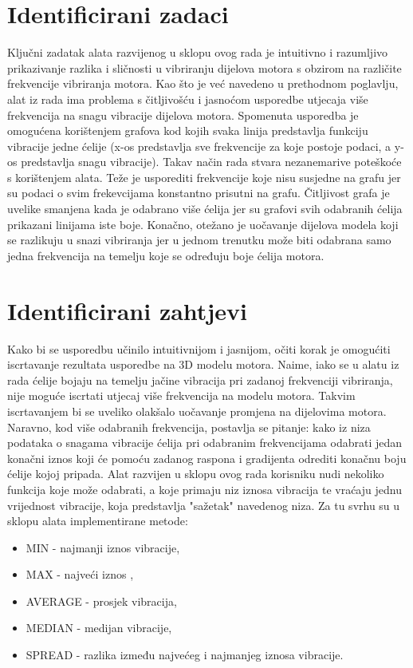 \documentclass[times, utf8, diplomski]{fer}
\begin{document}
\section{Identificirani zadaci}
Ključni zadatak alata razvijenog u sklopu ovog rada je intuitivno i razumljivo prikazivanje razlika i sličnosti u vibriranju dijelova motora s obzirom na različite frekvencije vibriranja motora. Kao što je već navedeno u prethodnom poglavlju, alat iz rada \citep{matkovic2021getting} ima problema s čitljivošću i jasnoćom usporedbe utjecaja više frekvencija na snagu vibracije dijelova motora. Spomenuta usporedba je omogućena korištenjem grafova kod kojih svaka linija predstavlja funkciju vibracije jedne ćelije (x-os predstavlja sve frekvencije za koje postoje podaci, a y-os predstavlja snagu vibracije). Takav način rada stvara nezanemarive poteškoće s korištenjem alata. Teže je usporediti frekvencije koje nisu susjedne na grafu jer su podaci o svim frekevcijama konstantno prisutni na grafu. Čitljivost grafa je uvelike smanjena kada je odabrano više ćelija jer su grafovi svih odabranih ćelija prikazani linijama iste boje. Konačno, otežano je uočavanje dijelova modela koji se razlikuju u snazi vibriranja jer u jednom trenutku može biti odabrana samo jedna frekvencija na temelju koje se određuju boje ćelija motora.

\section{Identificirani zahtjevi} \label{requests-section}
Kako bi se usporedbu učinilo intuitivnijom i jasnijom, očiti korak je omogućiti iscrtavanje rezultata usporedbe na 3D modelu motora. Naime, iako se u alatu iz rada \citep{matkovic2021getting} ćelije bojaju na temelju jačine vibracija pri zadanoj frekvenciji vibriranja, nije moguće iscrtati utjecaj više frekvencija na modelu motora. Takvim iscrtavanjem bi se uveliko olakšalo uočavanje promjena na dijelovima motora. Naravno, kod više odabranih frekvencija, postavlja se pitanje: kako iz niza podataka o snagama vibracije ćelija pri odabranim frekvencijama odabrati jedan konačni iznos koji će pomoću zadanog raspona i gradijenta odrediti konačnu boju ćelije kojoj pripada. Alat razvijen u sklopu ovog rada korisniku nudi nekoliko funkcija koje može odabrati, a koje primaju niz iznosa vibracija te vraćaju jednu vrijednost vibracije, koja predstavlja "sažetak" navedenog niza. Za tu svrhu su u sklopu alata implementirane metode:

\begin{itemize}
\item MIN - najmanji iznos vibracije,
\item MAX - najveći iznos ,
\item AVERAGE - prosjek vibracija,
\item MEDIAN - medijan vibracije,
\item SPREAD - razlika između najvećeg i najmanjeg iznosa vibracije.\\
\end{itemize}
\end{document}
